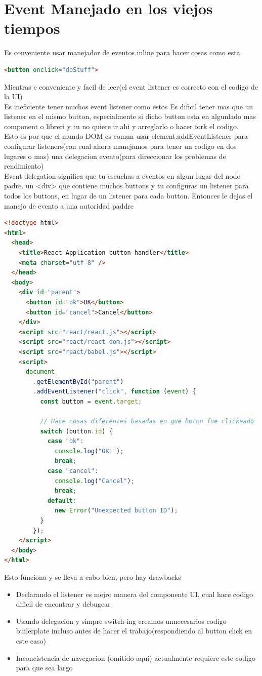 \section{Event Manejado en los viejos tiempos}
Es conveniente usar manejador de eventos inline  para hacer cosas como esta
\begin{lstlisting}[language=html]
<button onclick="doStuff">
\end{lstlisting}
Mientras e conveniente y facil de leer(el event listener es correcto con el codigo de la UI)\\
Es ineficiente tener muchos event listener como estos Es dificil tener mas que un listener en el mismo button, especialmente si dicho button esta en algunlado mas component o libreri y tu no quiere ir ahi y arreglarlo o hacer fork el codigo.\\
Esto es por que el mundo DOM es comun usar element.addEventListener para configurar listeners(con cual ahora manejamos para tener un codigo en dos lugares o mas) una delegacion evento(para direccionar los problemas de rendimiento)\\
Event delegation significa que tu escuchas a eventos en algun lugar del nodo padre. un <div> que contiene muchos buttons y tu configuras un listener para todos los buttons, en lugar de un listener para cada button. Entonces le dejas el manejo de evento a una autoridad paddre
\begin{lstlisting}[language=html]
<!doctype html>
<html>
  <head>
    <title>React Application button handler</title>
    <meta charset="utf-8" />
  </head>
  <body>
    <div id="parent">
      <button id="ok">OK</button>
      <button id="cancel">Cancel</button>
    </div>
    <script src="react/react.js"></script>
    <script src="react/react-dom.js"></script>
    <script src="react/babel.js"></script>
    <script>
      document
        .getElementById("parent")
        .addEventListener("click", function (event) {
          const button = event.target;

          // Hace cosas diferentes basadas en que boton fue clickeado
          switch (button.id) {
            case "ok":
              console.log("OK!");
              break;
            case "cancel":
              console.log("Cancel");
              break;
            default:
              new Error("Unexpected button ID");
          }
        });
    </script>
  </body>
</html>
\end{lstlisting}
Esto funciona y se lleva a cabo bien, pero hay drawbacks
\begin{itemize}
  \item Declarando el listener es mejro manera del componente UI, cual hace codigo dificil de encontrar y debugear
  \item Usando delegacion  y simpre switch-ing creamos unnecesarios codigo builerplate incluso antes de hacer el trabajo(respondiendo al button click en este caso)
  \item Inconcistencia de navegacion (omitido aqui) actualmente requiere este codigo para que sea largo
\end{itemize}
